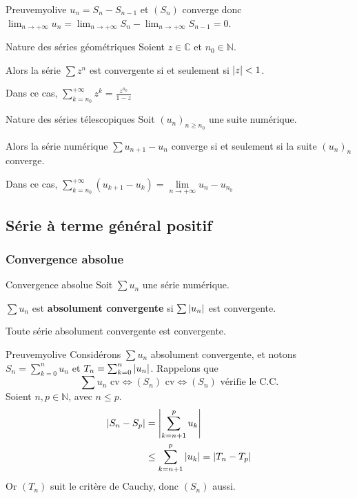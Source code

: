     \begin{demo}{Preuve}{myolive}
        $u_n = S_n - S_{n-1}$ et $(S_n)$ converge donc $\lim_{n \rightarrow +\infty} u_n = \lim_{n \rightarrow +\infty} S_n - \lim_{n \rightarrow +\infty} S_{n-1} = 0$.
    \end{demo}

    \begin{theo}{Nature des séries géométriques}{}
        Soient $z \in \mathbb{C}$ et $n_0 \in \mathbb{N}$.

        Alors la série $\sum z^n$ est convergente si et seulement si $\left\lvert z\right\rvert < 1$. 

        Dans ce cas, $\sum\limits_{k = n_0}^{+\infty} z^k = \frac{z^{n_0}}{1-z}$
    \end{theo}

    \begin{prop}{Nature des séries télescopiques}{}
        Soit $(u_n)_{n \geq n_0}$ une suite numérique.
    
        Alors la série numérique $\sum u_{n+1}-u_n$ converge si et seulement si la suite $(u_n)_n$ converge. 
    
        Dans ce cas, $\sum\limits_{k=n_0}^{+\infty} (u_{k+1}-u_k) = \lim\limits_{n \rightarrow +\infty}u_n - u_{n_0}$
    \end{prop}

    \subsection{Série à terme général positif}

        \subsubsection{Convergence absolue}

    \begin{defi}{Convergence absolue}{}
        Soit $\sum u_n$ une série numérique.

        $\sum u_n$ est \textbf{absolument convergente} si $\sum \left\lvert u_n\right\rvert$ est convergente.
    \end{defi}

    \begin{prop}{}{}
        Toute série absolument convergente est convergente.
    \end{prop}

    \begin{demo}{Preuve}{myolive}
        Considérons $\sum u_n$ absolument convergente, et notons $S_n = \sum_{k=0}^{n} u_n$ et $T_n = \sum_{k=0}^{n} \left\lvert u_n\right\rvert$. Rappelons que 
        \[ \sum u_n \text{ cv} \iff (S_n) \text{ cv} \iff (S_n) \text{ vérifie le C.C.} \] 
        Soient $n,p \in \mathbb{N}$, avec $n \leq p$.
            \begin{align*}
                \left\lvert S_n - S_p\right\rvert &= \left\lvert \sum_{k=n+1}^{p} u_k\right\rvert \\
                &\leq \sum_{k=n+1}^{p} \left\lvert u_k\right\rvert = \left\lvert T_n - T_p\right\rvert
            \end{align*}
        Or $(T_n)$ suit le critère de Cauchy, donc $(S_n)$ aussi.
    \end{demo}

